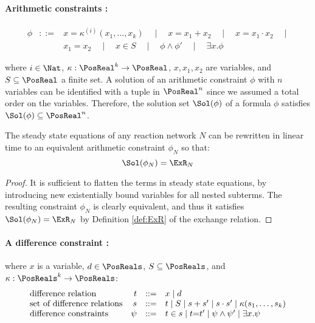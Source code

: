 \documentclass[a4paper,10pt]{article}
\title{}
\author{}
\date{}
\begin{document}
\maketitle

\paragraph{Arithmetic constraints :}
$$
\begin{array}{rcl}
   \phi &::=   &  x{=}\kappa^{(i)}(x_1,\ldots,x_k)  \quad\mid\quad x=x_1+x_2
                 \quad\mid\quad x=x_1\cdot x_2 \quad\mid       \\
           &&  x_1=x_2  \quad\mid\quad x\in S \quad\mid\quad \phi \wedge \phi' \quad\mid\quad \exists x.\phi
\end{array}
$$ 

where $i\in \Nat$, $\kappa:\PosReal^k\to\PosReal$, $x,x_1,x_2$ are variables, and $S\subseteq\PosReal$ a finite set.
A solution of an arithmetic constraint $\phi$ with $n$ variables can be identified with a tuple in $\PosReal^n$ since we assumed a total
order on the variables. Therefore, the solution set $\Sol(\phi)$ of a formula $\phi$ satisfies $\Sol(\phi)\subseteq \PosReal^n$.


\begin{lemma}
The steady state equations of any reaction network
$N$ can be rewritten in linear time to an equivalent
arithmetic constraint $\phi_N$ so that:
       $$\Sol(\phi_N) = \ExR_N$$
\end{lemma}

\begin{proof}
It is sufficient to flatten the terms in steady state equations, 
by introducing new existentially bound variables for all nested 
subterms. The resulting constraint $\phi_N$  is clearly equivalent, 
and thus it satisfies $\Sol(\phi_N) = \ExR_N$ by Definition
\ref{def:ExR} of the exchange relation.
\end{proof}

\paragraph{A difference constraint :}
where $x$ is a variable, $d \in \PosReals$, 
$S\subseteq \PosReals$, and  $\kappa:\PosReals^k\to \PosReals$:
$$
\begin{array}{l@{\quad}rcl}
\text{difference relation} &   t  &  ::=& x \mid d \\
\text{set of difference relations} 
            &   s   & ::=& t \mid S \mid s+s' \mid s\cdot s'
                                   \mid \kappa(s_1,\ldots,s_k)  \\
\text{difference constraints} &   \psi &::=& t \in s \mid 
            t {=}t' \mid
            \psi \wedge \psi' \mid \exists x.\psi
\end{array}
$$
\end{document}
